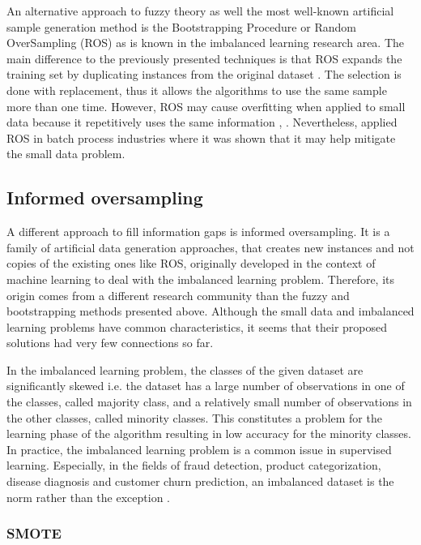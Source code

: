 \documentclass[parskip=full]{scrartcl}
\begin{document}
An alternative approach to fuzzy theory as well the most well-known artificial sample generation method is the Bootstrapping Procedure \cite{AbdulLateh.2017} or Random OverSampling (ROS) as is known in the imbalanced learning research area. The main difference to the previously presented techniques is that ROS expands the training set by duplicating instances from the original dataset \cite{Efron.1993}. The selection is done with replacement, thus it allows the algorithms to use the same sample more than one time. However, ROS may cause overfitting when applied to small data because it repetitively uses the same information \cite{Tsai.2015}, \cite{Li.2018}. Nevertheless, \cite{Ivanescu.2006} applied ROS in batch process industries where it was shown that it may help mitigate the small data problem.

\subsection{Informed oversampling}

A different approach to fill information gaps is informed oversampling. It is a family of artificial data generation approaches, that creates new instances and not copies of the existing ones like ROS, originally developed in the context of machine learning to deal with the imbalanced learning problem. Therefore, its origin comes from a different research community than the fuzzy and bootstrapping methods presented above. Although the small data and imbalanced learning problems have common characteristics, it seems that their proposed solutions had very few connections so far.

In the imbalanced learning problem, the classes of the given dataset are significantly skewed i.e. the dataset has a large number of observations in one of the classes, called majority class, and a relatively small number of observations in the other classes, called minority classes. This constitutes a problem for the learning phase of the algorithm resulting in low accuracy for the minority classes. In practice, the imbalanced learning problem is a common issue in supervised learning. Especially, in the fields of fraud detection, product categorization, disease diagnosis and customer churn prediction, an imbalanced dataset is the norm rather than the exception \cite{He.2013,Chen.2012,Verbeke.2012}.

\subsubsection{SMOTE}
\end{document}

